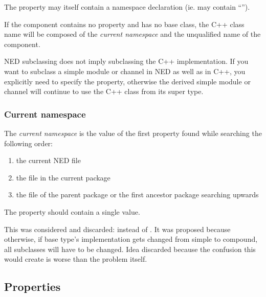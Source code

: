 \begin{note}
    The  property may itself contain a namespace declaration (ie.
    may contain ``\ttt{::}'').
\end{note}

If the component contains no  property and has no base
class, the C++ class name will be composed of the \textit{current namespace} and the
unqualified name of the component.

\begin{note}
    NED subclassing does not imply subclassing the C++ implementation. If you
    want to subclass a simple module or channel in NED as well as in C++, you
    explicitly need to specify the  property, otherwise the
    derived simple module or channel will continue to use the C++ class from its
    super type.
\end{note}

\subsubsection{Current namespace}
\label{cha:ned-ref:current-namespace}

The \textit{current namespace} is the value of the first 
property found while searching the following order:
\begin{enumerate}
  \item the current NED file
  \item the  file in the current package
  \item the  file of the parent package or the first ancestor
        package searching upwards
\end{enumerate}

The  property should contain a single value.

\begin{note}
    This was considered and discarded: 
    instead of . It was proposed because
    otherwise, if base type's implementation gets changed from simple to compound, all
    subclasses will have to be changed. Idea discarded because the confusion
    this would create is worse than the problem itself.
\end{note}



\subsection{Properties}
\label{ch-ned-ref:sec:properties}

